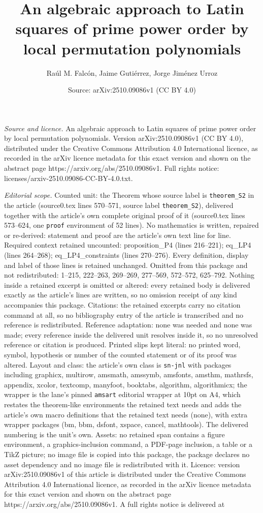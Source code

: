 \documentclass[10pt,a4paper]{amsart}
\title[An algebraic approach to Latin squares of prime power order ]{An algebraic approach to Latin squares of prime power order by local permutation polynomials}
\author{Ra\'ul M. Falc\'on, Jaime Guti\'errez, Jorge Jim\'enez Urroz}
\date{Source: arXiv:2510.09086v1 (CC BY 4.0)}
\begin{document}
\maketitle

\noindent\emph{Source and licence.} An algebraic approach to Latin squares of prime power order by local permutation polynomials. Version arXiv:2510.09086v1 (CC BY 4.0), distributed under the Creative Commons Attribution 4.0 International licence, as recorded in the arXiv licence metadata for this exact version and shown on the abstract page https://arxiv.org/abs/2510.09086v1. Full rights notice: licenses/arxiv-2510.09086-CC-BY-4.0.txt.\par\smallskip

\noindent\textit{Editorial scope.} Counted unit: the Theorem whose source label is \texttt{theorem\_S2} in the article (source0.tex lines 570--571, source label \texttt{theorem\_S2}), delivered together with the article's own complete original proof of it (source0.tex lines 573--624, one \texttt{proof} environment of 52 lines). No mathematics is written, repaired or re-derived: statement and proof are the article's own text line for line. Required context retained uncounted: proposition\_P4 (lines 216--221); eq\_LP4 (lines 264--268); eq\_LP4\_constraints (lines 270--276). Every definition, display and label of those lines is retained unchanged. Omitted from this package and not redistributed: 1--215, 222--263, 269--269, 277--569, 572--572, 625--792. Nothing inside a retained excerpt is omitted or altered: every retained body is delivered exactly as the article's lines are written, so no omission receipt of any kind accompanies this package. Citations: the retained excerpts carry no citation command at all, so no bibliography entry of the article is transcribed and no reference is redistributed. Reference adaptation: none was needed and none was made; every reference inside the delivered unit resolves inside it, so no unresolved reference or citation is produced. Printed slips kept literal: no printed word, symbol, hypothesis or number of the counted statement or of its proof was altered. Layout and class: the article's own class is \texttt{sn-jnl} with packages including graphicx, multirow, amsmath, amssymb, amsfonts, amsthm, mathrsfs, appendix, xcolor, textcomp, manyfoot, booktabs, algorithm, algorithmicx; the wrapper is the lane's pinned \texttt{amsart} editorial wrapper at 10pt on A4, which restates the theorem-like environments the retained text needs and adds the article's own macro definitions that the retained text needs (none), with extra wrapper packages (bm, bbm, dsfont, xspace, cancel, mathtools). The delivered numbering is the unit's own. Assets: no retained span contains a figure environment, a graphics-inclusion command, a PDF-page inclusion, a table or a TikZ picture; no image file is copied into this package, the package declares no asset dependency and no image file is redistributed with it. Licence: version arXiv:2510.09086v1 of this article is distributed under the Creative Commons Attribution 4.0 International licence, as recorded in the arXiv licence metadata for this exact version and shown on the abstract page https://arxiv.org/abs/2510.09086v1. A full rights notice is delivered at 
\end{document}
